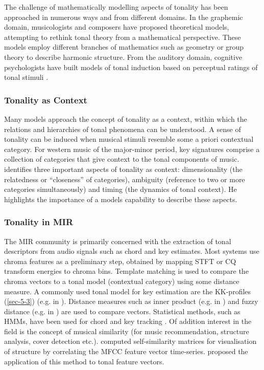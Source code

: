 \documentclass{article}
\begin{document}
The challenge of mathematically modelling aspects of tonality has been
approached in numerous ways and from different domains. In the
graphemic domain, musicologists and composers have proposed
theoretical models, attempting to rethink tonal theory from a
mathematical perspective. These models employ different branches of
mathematics such as geometry \citep{Tymoczko2012} or group theory
\citep{Ring2011} to describe harmonic structure. From the auditory
domain, cognitive psychologists have built models of tonal induction
based on perceptual ratings of tonal stimuli \citep{Krumhansl1990}.
\subsubsection{Tonality as Context}
\label{sec-2-2-1}

Many models approach the concept of tonality as a context, within
which the relations and hierarchies of tonal phenomena can be
understood. A sense of tonality can be induced when musical stimuli
resemble some a priori contextual category. For western music of the
major-minor period, key signatures comprise a collection of categories
that give context to the tonal components of
music. \citet{Martorell2013} identifies three important aspects of
tonality as context: dimensionality (the relatedness or ``closeness'' of
categories), ambiguity (reference to two or more categories
simultaneously) and timing (the dynamics of tonal context). He
highlights the importance of a models capability to describe these
aspects. 
\subsubsection{Tonality in MIR}
\label{sec-2-2-2}

The MIR community is primarily concerned with the extraction of tonal
descriptors from audio signals such as chord and key estimates. Most
systems use chroma features as a preliminary step, obtained by mapping
STFT or CQ transform energies to chroma bins. Template matching is
used to compare the chroma vectors to a tonal model (contextual
category) using some distance measure. A commonly used tonal model for
key estimation are the KK-profiles \citep{Krumhansl1990} (\ref{sec-5-3}) (e.g. in \citealt{Gomez2006}). Distance measures such as
inner product (e.g. in \citealt{Gomez2006}) and fuzzy distance
(e.g. in \citealt{Purwins2000}) are used to compare
vectors. Statistical methods, such as HMMs, have been used for chord
and key tracking \citep{Chai2005}. Of addition interest in the field
is the concept of musical similarity (for music recommendation,
structure analysis, cover detection etc.). \citet{Foote2000} computed
self-similarity matrices for visualisation of structure by correlating
the MFCC feature vector time-series. \citet{Gomez2006} proposed the
application of this method to tonal feature vectors.
\end{document}
